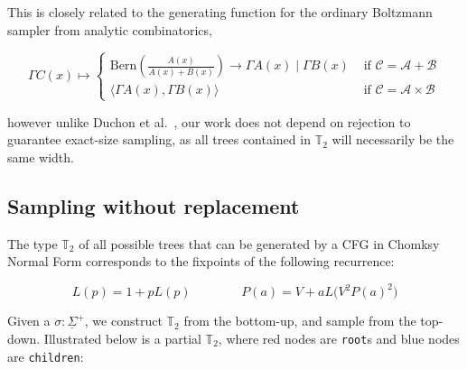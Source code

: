 \documentclass[sigplan,nonacm,anonymous]{acmart}\settopmatter{printfolios=false,printccs=false,printacmref=false}
\begin{document}
This is closely related to the generating function for the ordinary Boltzmann sampler from analytic combinatorics,

\begin{equation*}
  \Gamma C(x) \mapsto \begin{cases}
  \text{Bern} \left(\frac{A(x)}{A(x) + B(x)}\right) \rightarrow \Gamma A(x) \mid \Gamma B(x) & \text{ if } \mathcal{C}=\mathcal{A}+\mathcal{B} \\
  \big\langle \Gamma A(x), \Gamma B(x)\big\rangle & \text{ if } \mathcal{C}=\mathcal{A} \times \mathcal{B}
  \end{cases}
\end{equation*}

\noindent however unlike Duchon et al.~\cite{duchon2004boltzmann}, our work does not depend on rejection to guarantee exact-size sampling, as all trees contained in $\mathbb{T}_2$ will necessarily be the same width.

\pagebreak\subsection{Sampling without replacement}\label{sec:pairing}

The type $\mathbb{T}_2$ of all possible trees that can be generated by a CFG in Chomksy Normal Form corresponds to the fixpoints of the following recurrence:

\begin{equation*}
  L(p) = 1 + p L(p) \phantom{addspace} P(a) = V + a L\big(V^2P(a)^2\big)
\end{equation*}

Given a $\sigma: \underline\Sigma^+$, we construct $\mathbb{T}_2$ from the bottom-up, and sample from the top-down. Illustrated below is a partial $\mathbb{T}_2$, where red nodes are \texttt{root}s and blue nodes are \texttt{children}:
\end{document}
